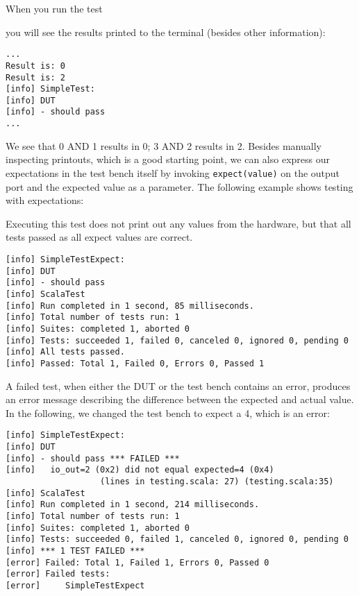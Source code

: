 \documentclass[%
    10pt,
    headinclude, footexclude,
    openright, %
    notitlepage,
    cleardoubleempty,
    headsepline,
    pointlessnumbers,
    bibtotoc, idxtotoc,
    ]{scrbook}
\newcommand{\code}[1]{{\lstinline[basicstyle=\small\ttfamily]{#1}}}
\begin{document}
When you run the test


\noindent you will see the results printed to the terminal
(besides other information):

\begin{verbatim}
...
Result is: 0
Result is: 2
[info] SimpleTest:
[info] DUT
[info] - should pass
...
\end{verbatim}

We see that 0 AND 1 results in 0; 3 AND 2 results in 2.
Besides manually inspecting printouts, which is a good starting point, we can also
express our expectations in the test bench itself by invoking
\code{expect(value)} on the output port and the expected value as a parameter.
The following example shows testing with expectations:


Executing this test does not print out any values from the hardware,
but that all tests passed as all expect values are correct.

\begin{verbatim}
[info] SimpleTestExpect:
[info] DUT
[info] - should pass
[info] ScalaTest
[info] Run completed in 1 second, 85 milliseconds.
[info] Total number of tests run: 1
[info] Suites: completed 1, aborted 0
[info] Tests: succeeded 1, failed 0, canceled 0, ignored 0, pending 0
[info] All tests passed.
[info] Passed: Total 1, Failed 0, Errors 0, Passed 1
\end{verbatim}

A failed test, when either the DUT or the test bench contains an error,
produces an error message describing the difference between the expected and actual
value. In the following, we changed the test bench to expect a 4, which is an error:

\begin{verbatim}
[info] SimpleTestExpect:
[info] DUT
[info] - should pass *** FAILED ***
[info]   io_out=2 (0x2) did not equal expected=4 (0x4)
                   (lines in testing.scala: 27) (testing.scala:35)
[info] ScalaTest
[info] Run completed in 1 second, 214 milliseconds.
[info] Total number of tests run: 1
[info] Suites: completed 1, aborted 0
[info] Tests: succeeded 0, failed 1, canceled 0, ignored 0, pending 0
[info] *** 1 TEST FAILED ***
[error] Failed: Total 1, Failed 1, Errors 0, Passed 0
[error] Failed tests:
[error] 	SimpleTestExpect
\end{verbatim}
\end{document}
